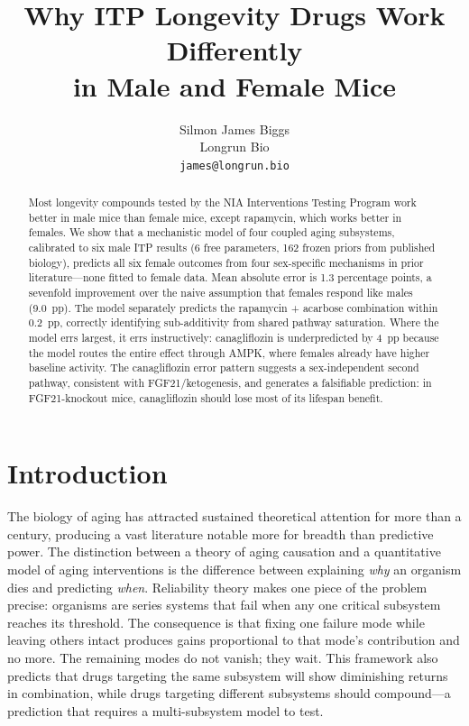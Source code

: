 \documentclass[11pt]{article}
\title{Why ITP Longevity Drugs Work Differently\\in Male and Female Mice}
\author{Silmon James Biggs\\[0.3em]
\normalsize Longrun Bio\\
\normalsize \texttt{james@longrun.bio}}
\date{}
\begin{document}
\maketitle

\begin{abstract}
Most longevity compounds tested by the NIA Interventions Testing Program work better in male mice than female mice, except rapamycin, which works better in females. We show that a mechanistic model of four coupled aging subsystems, calibrated to six male ITP results (6 free parameters, 162 frozen priors from published biology), predicts all six female outcomes from four sex-specific mechanisms in prior literature---none fitted to female data. Mean absolute error is 1.3 percentage points, a sevenfold improvement over the naive assumption that females respond like males (9.0~pp). The model separately predicts the rapamycin + acarbose combination within 0.2~pp, correctly identifying sub-additivity from shared pathway saturation. Where the model errs largest, it errs instructively: canagliflozin is underpredicted by 4~pp because the model routes the entire effect through AMPK, where females already have higher baseline activity. The canagliflozin error pattern suggests a sex-independent second pathway, consistent with FGF21/ketogenesis, and generates a falsifiable prediction: in FGF21-knockout mice, canagliflozin should lose most of its lifespan benefit.
\end{abstract}

\section{Introduction}

The biology of aging has attracted sustained theoretical attention for more than a century, producing a vast literature notable more for breadth than predictive power. The distinction between a theory of aging causation and a quantitative model of aging interventions is the difference between explaining \emph{why} an organism dies and predicting \emph{when}. Reliability theory \citep{Gavrilov2001} makes one piece of the problem precise: organisms are series systems that fail when any one critical subsystem reaches its threshold. The consequence is that fixing one failure mode while leaving others intact produces gains proportional to that mode's contribution and no more. The remaining modes do not vanish; they wait. This framework also predicts that drugs targeting the same subsystem will show diminishing returns in combination, while drugs targeting different subsystems should compound---a prediction that requires a multi-subsystem model to test.
\end{document}
